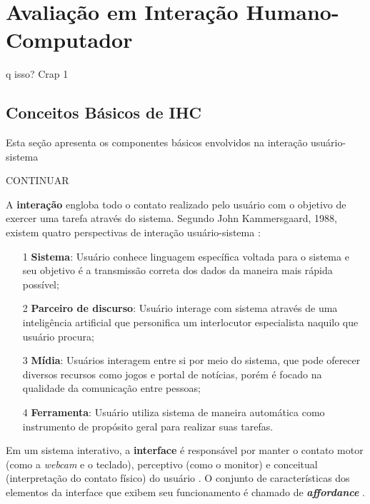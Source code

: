 \chapter{Avaliação em Interação Humano-Computador}

q isso? Crap 1

\section{Conceitos Básicos de IHC} \label{cbIHC}

\indent Esta seção apresenta os componentes básicos envolvidos na interação usuário-sistema 

\indent CONTINUAR

\indent A \textbf{interação} engloba todo o contato realizado pelo usuário com o objetivo de exercer uma tarefa através do sistema. Segundo John Kammersgaard, 1988, existem quatro perspectivas de interação usuário-sistema \cite[p. 21]{IHCbook}:
\begin{itemize}
\item[1] \textbf{Sistema}: Usuário conhece linguagem específica voltada para o sistema e seu objetivo é a transmissão correta dos dados da maneira mais rápida possível;
\item[2] \textbf{Parceiro de discurso}: Usuário interage com sistema através de uma inteligência artificial que personifica um interlocutor especialista naquilo que usuário procura;
\item[3] \textbf{Mídia}: Usuários interagem entre si por meio do sistema, que pode oferecer diversos recursos como jogos e portal de notícias, porém é focado na qualidade da comunicação entre pessoas;
\item[4] \textbf{Ferramenta}: Usuário utiliza sistema de maneira automática como instrumento de propósito geral para realizar suas tarefas. 
\end{itemize}

\indent Em um sistema interativo, a \textbf{interface} é responsável por manter o contato motor (como a \textit{webcam} e o teclado), perceptivo (como o monitor) e conceitual (interpretação do contato físico) do usuário \cite[p. 25]{IHCbook}. O conjunto de características dos elementos da interface que exibem seu funcionamento é chamado de \textbf{\textit{affordance}} \cite[p. 27]{IHCbook}. 

